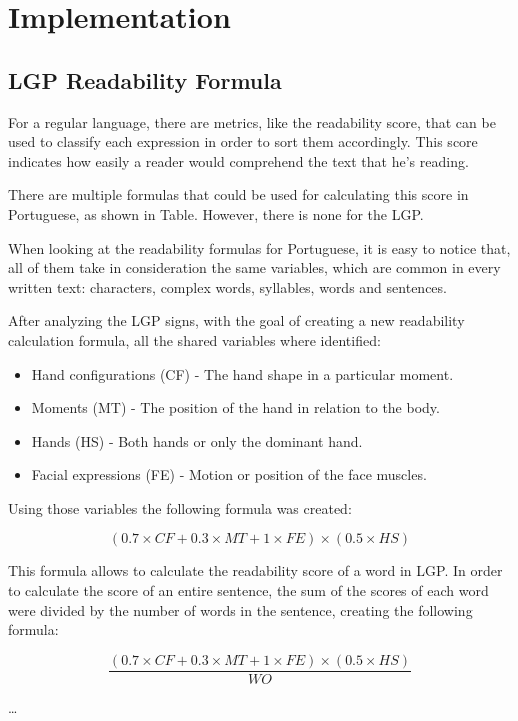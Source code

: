 
\chapter{Implementation} %
\label{chap:Chapter5}

\section{LGP Readability Formula}

For a regular language, there are metrics, like the readability score, that can be used to classify each expression in order to sort them accordingly.
This score indicates how easily a reader would comprehend the text that he's reading.

There are multiple formulas that could be used for calculating this score in Portuguese, as shown in Table. %
However, there is none for the LGP.

When looking at the readability formulas for Portuguese, it is easy to notice that, all of them take in consideration the same variables, which are common in every written text: characters, complex words, syllables, words and sentences.

After analyzing the LGP signs, with the goal of creating a new readability calculation formula, all the shared variables where identified:

\begin{itemize}
    \item Hand configurations (CF) - The hand shape in a particular moment.
    \item Moments (MT) - The position of the hand in relation to the body.
    \item Hands (HS) - Both hands or only the dominant hand.
    \item Facial expressions (FE) - Motion or position of the face muscles.
\end{itemize}

Using those variables the following formula was created:

\begin{equation}
(0.7 \times CF + 0.3 \times MT + 1 \times FE) \times (0.5 \times HS)
\label{wordScore}
\end{equation}

This formula allows to calculate the readability score of a word in LGP.
In order to calculate the score of an entire sentence, the sum of the scores of each word were divided by the number of words in the sentence, creating the following formula:

\begin{equation}
    \frac{(0.7 \times CF + 0.3 \times MT + 1 \times FE) \times (0.5 \times HS)}{WO}
\label{sentecneScore}
\end{equation}

\dots

